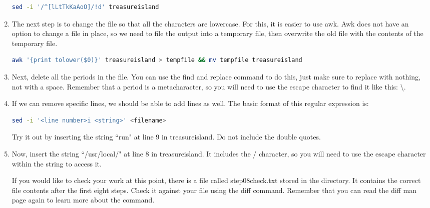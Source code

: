 \documentclass[11pt,a4paper]{article}
\begin{document}
\begin{enumerate}
\begin{lstlisting}[basicstyle=\ttfamily, backgroundcolor = \color{lightgray}, language = bash, xleftmargin = 0cm, framexleftmargin = 1em, breaklines=true]
sed -i '/^[lLtTkKaAoO]/!d' treasureisland
\end{lstlisting}

\item The next step is to change the file so that all the characters are lowercase. For this, it is easier to use awk. Awk does not have an option to change a file in place, so we need to file the output into a temporary file, then overwrite the old file with the contents of the temporary file. 

\begin{lstlisting}[basicstyle=\ttfamily, backgroundcolor = \color{lightgray}, language = bash, xleftmargin = 0cm, framexleftmargin = 1em, breaklines=true]
awk '{print tolower($0)}' treasureisland > tempfile && mv tempfile treasureisland
\end{lstlisting}

\item Next, delete all the periods in the file. You can use the find and replace command to do this, just make sure to replace with nothing, not with a space. Remember that a period is a metacharacter, so you will need to use the escape character to find it like this: \textbackslash.

\item If we can remove specific lines, we should be able to add lines as well. The basic format of this regular expression is:

\begin{lstlisting}[basicstyle=\ttfamily, backgroundcolor = \color{lightgray}, language = bash, xleftmargin = 0cm, framexleftmargin = 1em, breaklines=true]
sed -i '<line number>i <string>' <filename>
\end{lstlisting}

Try it out by inserting the string ``run" at line 9 in treasureisland. Do not include the double quotes.

\item Now, insert the string ``/usr/local/" at line 8 in treasureisland. It includes the / character, so you will need to use the escape character within the string to access it.

If you would like to check your work at this point, there is a file called step08check.txt stored in the directory. It contains the correct file contents after the first eight steps. Check it against your file using the diff command. Remember that you can read the diff man page again to learn more about the command.


\end{enumerate}
\end{document}
